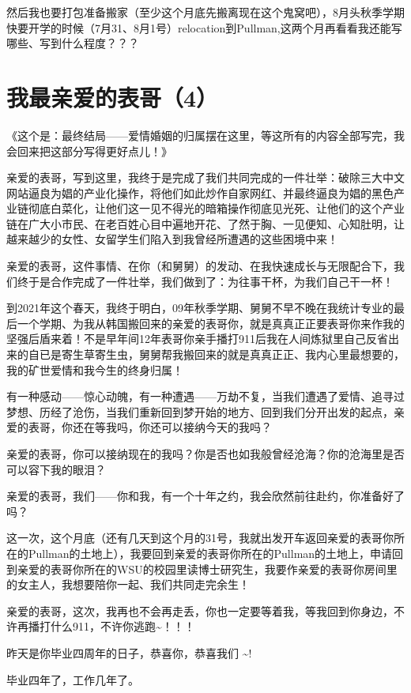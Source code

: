 \documentclass[9pt, b5paper]{article}
\begin{document}
然后我也要打包准备搬家（至少这个月底先搬离现在这个鬼窝吧），8月头秋季学期快要开学的时候（7月31、8月1号）relocation到Pullman,这两个月再看看我还能写哪些、写到什么程度？？？

\section{我最亲爱的表哥（4）}
\label{sec:org964fdd0}

《这个是：最终结局——爱情婚姻的归属摆在这里，等这所有的内容全部写完，我会回来把这部分写得更好点儿！》

亲爱的表哥，写到这里，我终于是完成了我们共同完成的一件壮举：破除三大中文网站逼良为娼的产业化操作，将他们如此炒作自家网红、并最终逼良为娼的黑色产业链彻底白菜化，让他们这一见不得光的暗箱操作彻底见光死、让他们的这个产业链在广大小市民、在老百姓心目中遍地开花、了然于胸、一见便知、心知肚明，让越来越少的女性、女留学生们陷入到我曾经所遭遇的这些困境中来！

亲爱的表哥，这件事情、在你（和舅舅）的发动、在我快速成长与无限配合下，我们终于是合作完成了一件壮举，我们做到了：为往事干杯，为我们自己干一杯！

到2021年这个春天，我终于明白，09年秋季学期、舅舅不早不晚在我统计专业的最后一个学期、为我从韩国搬回来的亲爱的表哥你，就是真真正正要表哥你来作我的坚强后盾来着！不是早年间12年表哥你亲手播打911后我在人间炼狱里自己反省出来的自已是寄生草寄生虫，舅舅帮我搬回来的就是真真正正、我内心里最想要的，我的矿世爱情和我今生的终身归属！

有一种感动——惊心动魄，有一种遭遇——万劫不复，当我们遭遇了爱情、追寻过梦想、历经了沧伤，当我们重新回到梦开始的地方、回到我们分开出发的起点，亲爱的表哥，你还在等我吗，你还可以接纳今天的我吗？

亲爱的表哥，你可以接纳现在的我吗？你是否也如我般曾经沧海？你的沧海里是否可以容下我的眼泪？

亲爱的表哥，我们——你和我，有一个十年之约，我会欣然前往赴约，你准备好了吗？

这一次，这个月底（还有几天到这个月的31号，我就出发开车返回亲爱的表哥你所在的Pullman的土地上），我要回到亲爱的表哥你所在的Pullman的土地上，申请回到亲爱的表哥你所在的WSU的校园里读博士研究生，我要作亲爱的表哥你房间里的女主人，我想要陪你一起、我们共同走完余生！

亲爱的表哥，这次，我再也不会再走丢，你也一定要等着我，等我回到你身边，不许再播打什么911，不许你逃跑\textasciitilde{}！！！

昨天是你毕业四周年的日子，恭喜你，恭喜我们 \textasciitilde{}! 

毕业四年了，工作几年了。 
\end{document}

